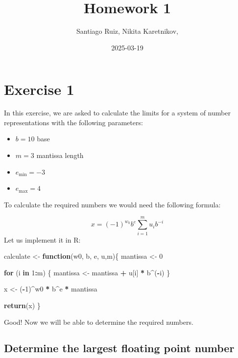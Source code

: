 \documentclass[
]{article}
\title{\textbf{Homework 1}}
\author{Santiago Ruiz, Nikita Karetnikov,}
\date{2025-03-19}
\newenvironment{Shaded}{\begin{snugshade}}{\end{snugshade}}
\newcommand{\ControlFlowTok}[1]{\textcolor[rgb]{0.13,0.29,0.53}{\textbf{#1}}}
\newcommand{\DecValTok}[1]{\textcolor[rgb]{0.00,0.00,0.81}{#1}}
\newcommand{\FunctionTok}[1]{\textcolor[rgb]{0.13,0.29,0.53}{\textbf{#1}}}
\newcommand{\NormalTok}[1]{#1}
\newcommand{\OtherTok}[1]{\textcolor[rgb]{0.56,0.35,0.01}{#1}}
\newcommand{\SpecialCharTok}[1]{\textcolor[rgb]{0.81,0.36,0.00}{\textbf{#1}}}
\providecommand{\tightlist}{%
  \setlength{\itemsep}{0pt}\setlength{\parskip}{0pt}}
\begin{document}
\maketitle

\section{Exercise 1}\label{exercise-1}

In this exercise, we are asked to calculate the limits for a system of
number representations with the following parameters:

\begin{itemize}
\tightlist
\item
  \(b = 10\) base
\item
  \(m = 3\) mantissa length
\item
  \(e_{\min} = -3\)
\item
  \(e_{\max} = 4\)
\end{itemize}

To calculate the required numbers we would need the following formula:

\[
x = (-1)^{w_0} b^e \sum_{i=1}^{m} u_i b^{-i}
\] Let us implement it in R:

\begin{Shaded}
\begin{Highlighting}[]
\NormalTok{calculate }\OtherTok{\textless{}{-}} \ControlFlowTok{function}\NormalTok{(w0, b, e, u,m)\{}
\NormalTok{  mantissa }\OtherTok{\textless{}{-}} \DecValTok{0}   
  
  \ControlFlowTok{for}\NormalTok{ (i }\ControlFlowTok{in} \DecValTok{1}\SpecialCharTok{:}\NormalTok{m) \{}
\NormalTok{    mantissa }\OtherTok{\textless{}{-}}\NormalTok{ mantissa }\SpecialCharTok{+}\NormalTok{ u[i] }\SpecialCharTok{*}\NormalTok{ b}\SpecialCharTok{\^{}}\NormalTok{(}\SpecialCharTok{{-}}\NormalTok{i)}
\NormalTok{  \}}
  
\NormalTok{  x }\OtherTok{\textless{}{-}}\NormalTok{ (}\SpecialCharTok{{-}}\DecValTok{1}\NormalTok{)}\SpecialCharTok{\^{}}\NormalTok{w0 }\SpecialCharTok{*}\NormalTok{ b}\SpecialCharTok{\^{}}\NormalTok{e }\SpecialCharTok{*}\NormalTok{ mantissa}
  
  \FunctionTok{return}\NormalTok{(x)}
\NormalTok{\}}
\end{Highlighting}
\end{Shaded}

Good! Now we will be able to determine the required numbers.

\subsection{Determine the largest floating point
number}\label{determine-the-largest-floating-point-number}
\end{document}

